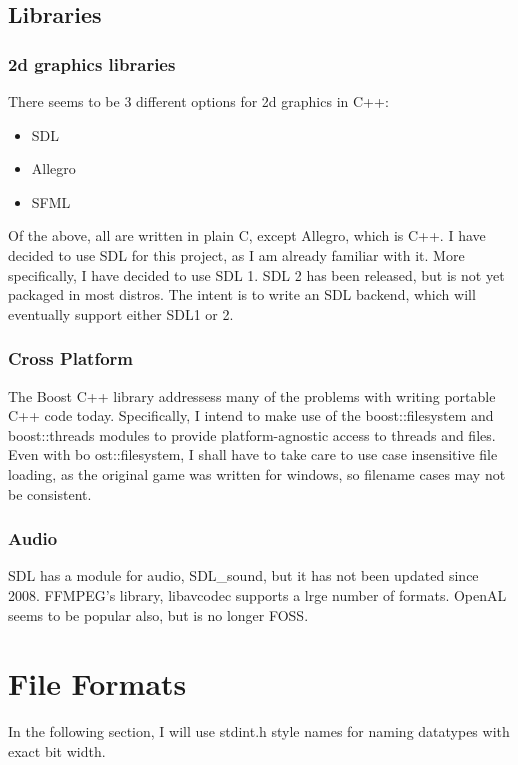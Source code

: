 \documentclass[a4paper]{article}
\begin{document}
    
    \subsection{Libraries}
        \subsubsection{2d graphics libraries}
    	There seems to be 3 different options for 2d graphics in C++:
    	\begin{itemize}
    	    \item{SDL}
    	    \item{Allegro}
    	    \item{SFML}
    	\end{itemize}
    	
    	Of the above, all are written in plain C, except Allegro, which is C++.
    	I have decided to use SDL for this project, as I am already familiar with it.
    	More specifically, I have decided to use SDL 1.
    	SDL 2 has been released, but is not yet packaged in most distros. 
    	The intent is to write an SDL backend, which will eventually support either SDL1 or 2.
    	
    	\subsubsection{Cross Platform}
        The Boost C++ library addressess many of the problems with writing portable C++ code today.
        Specifically, I intend to make use of the boost::filesystem and boost::threads modules to provide platform-agnostic access to threads and files.
        Even with bo	ost::filesystem, I shall have to take care to use case insensitive file loading, as the original game was written for windows, so filename cases may not be consistent.
        
        \subsubsection{Audio}
        SDL has a module for audio, SDL\_sound\cite{sdls}, but it has not been updated since 2008.
        FFMPEG's library, libavcodec\cite{libavcodec} supports a lrge number of formats.
        OpenAL seems to be popular also, but is no longer FOSS.
\newpage
\section{File Formats}
In the following section, I will use stdint.h style names for naming datatypes with exact bit width.
\end{document}
